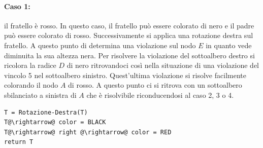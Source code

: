 \paragraph{Caso 1:} il fratello è rosso. In questo caso, il fratello può essere colorato di nero e il padre può essere colorato di rosso. Successivamente si applica una rotazione destra sul fratello. A questo punto di determina una violazione sul nodo $E$ in quanto vede diminuita la sua altezza nera. Per risolvere la violazione del sottoalbero destro si ricolora la radice $D$ di nero ritrovandoci così nella situazione di una violazione del vincolo 5 nel sottoalbero sinistro. Quest'ultima violazione si risolve facilmente colorando il nodo $A$ di rosso. A questo punto ci si ritrova con un sottoalbero sbilanciato a sinistra di $A$ che è risolvibile riconducendosi al caso 2, 3 o 4.
\begin{lstlisting}[language=asd,caption={Caso1(T)},label=lst:caso1-rb-del]
T = Rotazione-Destra(T)
T@\rightarrow@ color = BLACK
T@\rightarrow@ right @\rightarrow@ color = RED
return T
\end{lstlisting}
